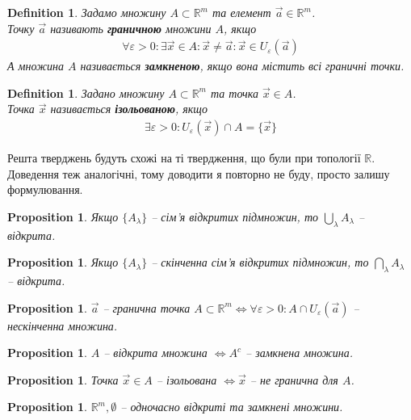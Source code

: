 \documentclass[a4paper, 10pt]{article}
\def\huge{\displaystyle}
\theoremstyle{theoremdd}
\theoremstyle{theoremdd}
\theoremstyle{theoremdd}
\newtheorem{definition}[theorem]{Definition}
\theoremstyle{theoremdd}
\theoremstyle{theoremdd}
\theoremstyle{theoremdd}
\newtheorem{proposition}[theorem]{Proposition}
\theoremstyle{theoremdd}
\theoremstyle{theoremdd}
\theoremstyle{theoremdd}
\begin{document}
\begin{definition}
Задамо множину $A \subset \mathbb{R}^m$ та елемент $\vec{a} \in \mathbb{R}^m$.\\
Точку $\vec{a}$ називають \textbf{граничною} множини $A$, якщо
\begin{align*}
\forall \varepsilon > 0: \exists \vec{x} \in A: \vec{x} \neq \vec{a}: \vec{x} \in U_{\varepsilon}(\vec{a})
\end{align*}
А множина $A$ називається \textbf{замкненою}, якщо вона містить всі граничні точки.
\end{definition}

\begin{definition}
Задано множину $A \subset \mathbb{R}^m$ та точка $\vec{x} \in A$.\\
Точка $\vec{x}$ називається \textbf{ізольованою}, якщо
\begin{align*}
\exists \varepsilon > 0: U_\varepsilon(\vec{x}) \cap A = \{\vec{x}\}
\end{align*}
\end{definition}

Решта тверджень будуть схожі на ті твердження, що були при топології $\mathbb{R}$. Доведення теж аналогічні, тому доводити я повторно не буду, просто залишу формулювання.
\begin{proposition}
Якщо $\{A_\lambda\}$ -- сім'я відкритих підмножин, то $\huge\bigcup_\lambda A_\lambda$ -- відкрита.
\end{proposition}

\begin{proposition}
Якщо $\{A_\lambda\}$ -- скінченна сім'я відкритих підмножин, то $\huge\bigcap_\lambda A_\lambda$ -- відкрита.
\end{proposition}

\begin{proposition}
$\vec{a}$ -- гранична точка $A \subset \mathbb{R}^m \iff \forall \varepsilon > 0: A \cap U_\varepsilon (\vec{a})$ -- нескінченна множина.
\end{proposition}

\begin{proposition}
$A$ -- відкрита множина $\iff A^c$ -- замкнена множина.
\end{proposition}

\begin{proposition}
Точка $\vec{x} \in A$ -- ізольована $\iff \vec{x}$ -- не гранична для $A$.
\end{proposition}

\begin{proposition}
$\mathbb{R}^m, \emptyset$ -- одночасно відкриті та замкнені множини.
\end{proposition}
\end{document}
